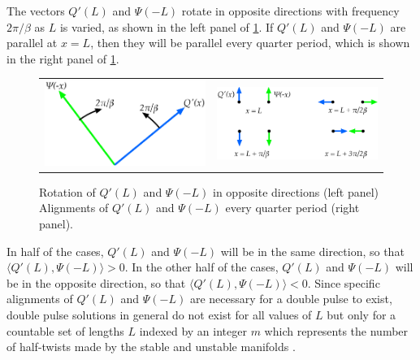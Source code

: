 \documentclass[thesis2.tex]{subfiles}
\begin{document}
The vectors $Q'(L)$ and $\Psi(-L)$ rotate in opposite directions with frequency $2 \pi/\beta$ as $L$ is varied, as shown in the left panel of \cref{fig:psiqrotate}. If $Q'(L)$ and $\Psi(-L)$ are parallel at $x = L$, then they will be parallel every quarter period, which is shown in the right panel of \cref{fig:psiqrotate}.
\begin{figure}
\begin{center}
\begin{tabular}{cc}
\includegraphics[width=8cm]{images/intro/psiqrotate} &
\includegraphics[width=8cm]{images/intro/psiqoneperiod}
\end{tabular}
\caption[Alignment of vectors necessary for a double pulse]{Rotation of $Q'(L)$ and $\Psi(-L)$ in opposite directions (left panel) Alignments of $Q'(L)$ and $\Psi(-L)$ every quarter period (right panel).}
\label{fig:psiqrotate}
\end{center}
\end{figure}
In half of the cases, $Q'(L)$ and $\Psi(-L)$ will be in the same direction, so that $\langle Q'(L), \Psi(-L) \rangle > 0$. In the other half of the cases, $Q'(L)$ and $\Psi(-L)$ will be in the opposite direction, so that $\langle Q'(L), \Psi(-L) \rangle < 0$. Since specific alignments of $Q'(L)$ and $\Psi(-L)$ are necessary for a double pulse to exist, double pulse solutions in general do not exist for all values of $L$ but only for a countable set of lengths $L$ indexed by an integer $m$ which represents the number of half-twists made by the stable and unstable manifolds \cite{SandstedeStrut}.  
\end{document}
